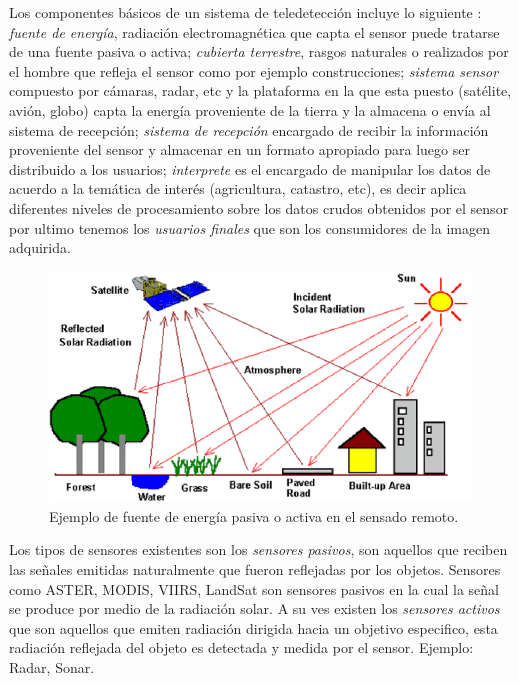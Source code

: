 Los componentes básicos de un sistema de teledetección incluye lo siguiente \citep{chuvieco}: \textit{fuente de energía},  radiación electromagnética que capta el sensor puede tratarse de una fuente pasiva o activa; \textit{cubierta terrestre}, rasgos naturales o 
realizados por el hombre que refleja el sensor como por ejemplo construcciones; \textit{sistema sensor} compuesto por cámaras, radar, etc  y la plataforma en la que esta puesto (satélite, avión, globo) capta la energía proveniente de la tierra y la almacena o envía al sistema de recepción; \textit{sistema de recepción} encargado de recibir la información proveniente del sensor y almacenar en un formato apropiado para luego ser distribuido a los usuarios; \textit{interprete} es el encargado de manipular los datos de acuerdo a la temática de interés (agricultura, catastro, etc), es decir aplica diferentes niveles de procesamiento sobre los datos crudos obtenidos por el sensor por ultimo tenemos los \textit{usuarios finales} que son los consumidores de la imagen adquirida.

\begin{figure}[H] \centering
  \includegraphics[scale=0.35, keepaspectratio=true,clip=true]{imagenes/MarcoTeorico/teledeteccion.png}
  \caption{Ejemplo de fuente de energía pasiva o activa en el sensado remoto.}\label{Fig:teledeteccion}
\end{figure}

Los tipos de sensores existentes son los  \textit{sensores pasivos}, son aquellos que reciben las señales emitidas naturalmente que fueron reflejadas por los objetos. Sensores como ASTER, MODIS, VIIRS, LandSat son sensores pasivos en la cual la señal se produce por medio de la radiación solar. A su ves existen los \textit{sensores activos} que son aquellos que emiten radiación dirigida hacia un objetivo especifico, esta radiación reflejada del objeto es detectada y medida por el sensor. Ejemplo: Radar, Sonar.

